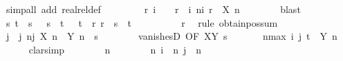 \begin{isabellebody}
\ {\isacharparenleft}{\kern0pt}simp{\isacharunderscore}{\kern0pt}all\ add{\isacharcolon}{\kern0pt}\ realrel{\isacharunderscore}{\kern0pt}def{\isacharparenright}{\kern0pt}\isanewline
\ \ \ \ \isamarkupfalse%
\ {\isacharasterisk}{\kern0pt}{\isacharasterisk}{\kern0pt}\ \isamarkupfalse%
\ r\ i\ \ {\isachardoublequoteopen}{}\ {\isacharless}{\kern0pt}\ r{\isachardoublequoteclose}\ \ i{\isacharcolon}{\kern0pt}\ {\isachardoublequoteopen}{\isasymforall}n{\isasymge}i{\isachardot}{\kern0pt}\ r\ {\isacharless}{\kern0pt}\ X\ n{\isachardoublequoteclose}\isanewline
\ \ \ \ \ \ \isamarkupfalse%
\ blast\isanewline
\ \ \ \ \isamarkupfalse%
\ s\ t\ \ s{\isacharcolon}{\kern0pt}\ {\isachardoublequoteopen}{}\ {\isacharless}{\kern0pt}\ s{\isachardoublequoteclose}\ \ t{\isacharcolon}{\kern0pt}\ {\isachardoublequoteopen}{}\ {\isacharless}{\kern0pt}\ t{\isachardoublequoteclose}\ \ r{\isacharcolon}{\kern0pt}\ {\isachardoublequoteopen}r\ {\isacharequal}{\kern0pt}\ s\ {\isacharplus}{\kern0pt}\ t{\isachardoublequoteclose}\isanewline
\ \ \ \ \ \ \isamarkupfalse%
\ {\isacartoucheopen}{}\ {\isacharless}{\kern0pt}\ r{\isacartoucheclose}\ \isamarkupfalse%
\ {\isacharparenleft}{\kern0pt}rule\ obtain{\isacharunderscore}{\kern0pt}pos{\isacharunderscore}{\kern0pt}sum{\isacharparenright}{\kern0pt}\isanewline
\ \ \ \ \isamarkupfalse%
\ j\ \ j{\isacharcolon}{\kern0pt}\ {\isachardoublequoteopen}{\isasymforall}n{\isasymge}j{\isachardot}{\kern0pt}\ {\isasymbar}X\ n\ {\isacharminus}{\kern0pt}\ Y\ n{\isasymbar}\ {\isacharless}{\kern0pt}\ s{\isachardoublequoteclose}\isanewline
\ \ \ \ \ \ \isamarkupfalse%
\ vanishesD\ {\isacharbrackleft}{\kern0pt}OF\ XY\ s{\isacharbrackright}{\kern0pt}\ \isacommand{{\isachardot}{\kern0pt}{\isachardot}{\kern0pt}}\isamarkupfalse%
\isanewline
\ \ \ \ \isamarkupfalse%
\ {\isachardoublequoteopen}{\isasymforall}n{\isasymge}max\ i\ j{\isachardot}{\kern0pt}\ t\ {\isacharless}{\kern0pt}\ Y\ n{\isachardoublequoteclose}\isanewline
\ \ \ \ \isamarkupfalse%
\ clarsimp\isanewline
\ \ \ \ \ \ \isamarkupfalse%
\ n\isanewline
\ \ \ \ \ \ \isamarkupfalse%
\ n{\isacharcolon}{\kern0pt}\ {\isachardoublequoteopen}i\ {\isasymle}\ n{\isachardoublequoteclose}\ {\isachardoublequoteopen}j\ {\isasymle}\ n{\isachardoublequoteclose}\isanewline

\end{isabellebody}
